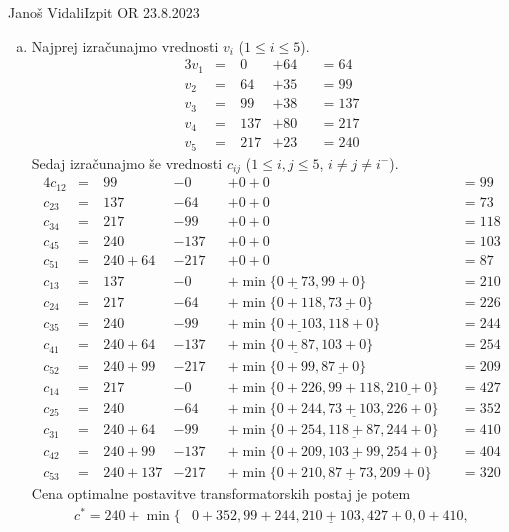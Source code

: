 \begin{naloga}{Janoš Vidali}{Izpit OR 23.8.2023}
\begin{odgovor}
\begin{enumerate}[(a)]
\item Najprej izračunajmo vrednosti $v_i$ ($1 \le i \le 5$).
\begin{alignat*}{3}
v_1 &=\ &   0 &+ 64 &&=  64 \\
v_2 &=\ &  64 &+ 35 &&=  99 \\
v_3 &=\ &  99 &+ 38 &&= 137 \\
v_4 &=\ & 137 &+ 80 &&= 217 \\
v_5 &=\ & 217 &+ 23 &&= 240
\end{alignat*}
Sedaj izračunajmo še vrednosti $c_{ij}$ ($1 \le i, j \le 5$, $i \ne j \ne i^-$).
\begin{alignat*}{4}
c_{12} &=\ &{}        99 &-   0 &&+ 0 + 0 &&=  99 \\
c_{23} &=\ &{}       137 &-  64 &&+ 0 + 0 &&=  73 \\
c_{34} &=\ &{}       217 &-  99 &&+ 0 + 0 &&= 118 \\
c_{45} &=\ &{}       240 &- 137 &&+ 0 + 0 &&= 103 \\
c_{51} &=\ &{} 240 +  64 &- 217 &&+ 0 + 0 &&=  87 \\
c_{13} &=\ &{}       137 &-   0 &&+ \min\{\underline{0+73}, 99+0\}   &&= 210 \\
c_{24} &=\ &{}       217 &-  64 &&+ \min\{0+118, \underline{73+0}\}  &&= 226 \\
c_{35} &=\ &{}       240 &-  99 &&+ \min\{\underline{0+103}, 118+0\} &&= 244 \\
c_{41} &=\ &{} 240 +  64 &- 137 &&+ \min\{\underline{0+87}, 103+0\}  &&= 254 \\
c_{52} &=\ &{} 240 +  99 &- 217 &&+ \min\{0+99, \underline{87+0}\}   &&= 209 \\
c_{14} &=\ &{}       217 &-   0 &&+ \min\{0+226, 99+118, \underline{210+0}\} &&= 427 \\
c_{25} &=\ &{}       240 &-  64 &&+ \min\{0+244, \underline{73+103}, 226+0\} &&= 352 \\
c_{31} &=\ &{} 240 +  64 &-  99 &&+ \min\{0+254, \underline{118+87}, 244+0\} &&= 410 \\
c_{42} &=\ &{} 240 +  99 &- 137 &&+ \min\{0+209, \underline{103+99}, 254+0\} &&= 404 \\
c_{53} &=\ &{} 240 + 137 &- 217 &&+ \min\{0+210, \underline{87+73}, 209+0\}  &&= 320
\end{alignat*}
Cena optimalne postavitve transformatorskih postaj je potem
\begin{align*}
c^* = 240 + \min\{&{} 0+352, 99+244, \underline{210+103}, 427+0, 0+410, \\

\end{align*}
\end{enumerate}
\end{odgovor}
\end{naloga}
